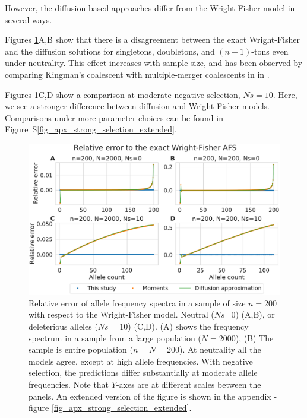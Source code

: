 \documentclass[review,nonatbib]{elsarticle}
\begin{document}
However, the diffusion-based approaches differ from the Wright-Fisher model
in several ways.

Figures \ref{fig_strong_selection}A,B show that there is a disagreement between the exact
Wright-Fisher and the diffusion solutions for singletons, doubletons, and $(n-1)$-tons even under neutrality. 
This effect increases with sample size, and has been observed by comparing
Kingman's coalescent with multiple-merger coalescents in  in \citep{Fu2006, BhaskarEtAl2014}.



Figures \ref{fig_strong_selection}C,D show a comparison at moderate negative selection, $Ns=10$.
Here, we see a stronger difference between diffusion and Wright-Fisher models. 
Comparisons under more parameter choices can be found in  Figure~S\ref{fig_apx_strong_selection_extended}.

\begin{figure}
  \centering
  \includegraphics[width=0.7\textheight]{fig/afs_comp_small.pdf}

  \caption{Relative error of allele frequency spectra in a sample of size $n=200$ with respect to
    the Wright-Fisher model. Neutral ($Ns$=0) (A,B), or deleterious alleles ($Ns=10$) (C,D). (A) shows
    the frequency spectrum in a sample from a large population ($N=2000$), (B) The sample is entire
    population ($n=N=200$). At neutrality all the models agree, except at high allele frequencies.
    With negative selection, the predictions differ substantially at moderate allele frequencies.
    Note that $Y$-axes are at different scales between the panels. An extended version of the figure
    is shown in the appendix - figure \ref{fig_apx_strong_selection_extended}.}

  \label{fig_strong_selection}
\end{figure}
\end{document}
